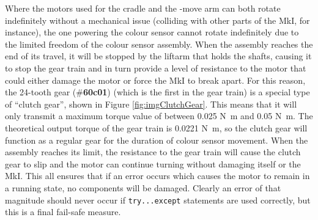 \documentclass{report}
\newcommand{\tbo}[1]{\textbf{#1}}
\newcommand{\legopiece}[1]{(\#\tbo{#1})}
\newcommand{\move}[1]{\uppercase{\texttt{\formatmovesnospace{#1}}}-move}
\begin{document}
	Where the motors used for the cradle and the \move{x} arm can both rotate indefinitely without a mechanical issue (colliding with other parts of the MkI, for instance), the one powering the colour sensor cannot rotate indefinitely due to the limited freedom of the colour sensor assembly. When the assembly reaches the end of its travel, it will be stopped by the liftarm that holds the shafts, causing it to stop the gear train and in turn provide a level of resistance to the motor that could either damage the motor or force the MkI to break apart. For this reason, the 24-tooth gear \legopiece{60c01} (which is the first in the gear train) is a special type of \enquote{clutch gear}, shown in Figure \ref{fig:imgClutchGear}. This means that it will only transmit a maximum torque value of between 0.025 \si{\newton\metre} and 0.05 \si{\newton\metre}. The theoretical output torque of the gear train is 0.0221 \si{\newton\metre}, so the clutch gear will function as a regular gear for the duration of colour sensor movement. When the assembly reaches its limit, the resistance to the gear train will cause the clutch gear to slip and the motor can continue turning without damaging itself or the MkI. This all ensures that if an error occurs which causes the motor to remain in a running state, no components will be damaged. Clearly an error of that magnitude should never occur if \lstinline|try...except| statements are used correctly, but this is a final fail-safe measure.
	
\end{document}
